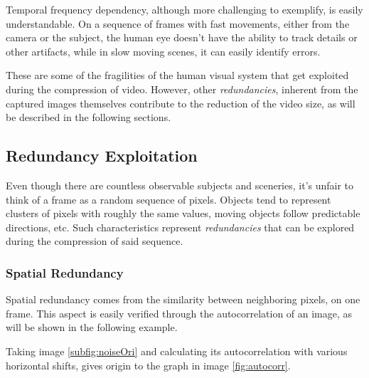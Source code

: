 Temporal frequency dependency, although more challenging to exemplify, is easily understandable. On a sequence of frames with fast movements, either from the camera or the subject, the human eye doesn't have the ability to track details or other artifacts, while in slow moving scenes, it can easily identify errors.

These are some of the fragilities of the human visual system that get exploited during the compression of video. However, other \emph{redundancies}, inherent from the captured images themselves contribute to the reduction of the video size, as will be described in the following sections.

\subsection{Redundancy Exploitation}


Even though there are countless observable subjects and sceneries, it's unfair to think of a frame as a random sequence of pixels. Objects tend to represent clusters of pixels with roughly the same values, moving objects follow predictable directions, etc. Such characteristics represent \emph{redundancies} that can be explored during the compression of said sequence.

\subsubsection{Spatial Redundancy} \label{sssec:spatred}

Spatial redundancy comes from the similarity between neighboring pixels, on one frame. This aspect is easily verified through the autocorrelation of an image, as will be shown in the following example.

Taking image \ref{subfig:noiseOri} and calculating its autocorrelation with various horizontal shifts, gives origin to the graph in image \ref{fig:autocorr}.

